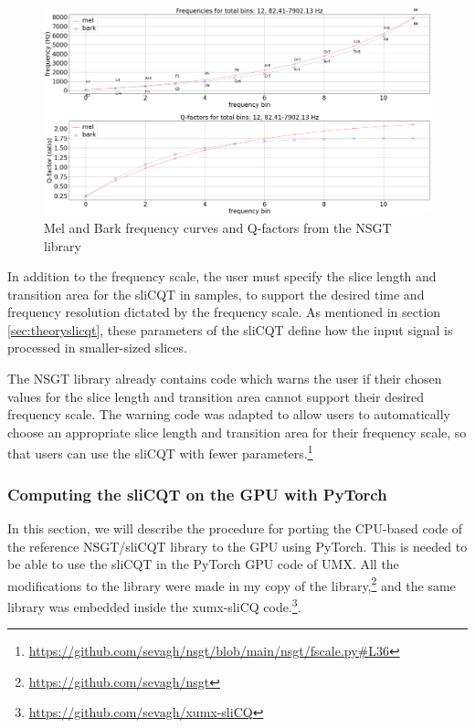 \documentclass[report.tex]{subfiles}
\begin{document}
\begin{figure}[ht]
	\centering
	\includegraphics[width=\textwidth]{./images-freqscales/melbarkpitchesqs.png}
	\caption{Mel and Bark frequency curves and Q-factors from the NSGT library}
	\label{fig:melbarkfsandqs}
\end{figure}

In addition to the frequency scale, the user must specify the slice length and transition area for the sliCQT in samples, to support the desired time and frequency resolution dictated by the frequency scale. As mentioned in section \ref{sec:theoryslicqt}, these parameters of the sliCQT define how the input signal is processed in smaller-sized slices.

The NSGT library already contains code which warns the user if their chosen values for the slice length and transition area cannot support their desired frequency scale. The warning code was adapted to allow users to automatically choose an appropriate slice length and transition area for their frequency scale, so that users can use the sliCQT with fewer parameters.\footnote{\url{https://github.com/sevagh/nsgt/blob/main/nsgt/fscale.py\#L36}}

\subsubsection{Computing the sliCQT on the GPU with PyTorch}
\label{sec:torchgpu}

In this section, we will describe the procedure for porting the CPU-based code of the reference NSGT/sliCQT library to the GPU using PyTorch. This is needed to be able to use the sliCQT in the PyTorch GPU code of UMX. All the modifications to the library were made in my copy of the library,\footnote{\url{https://github.com/sevagh/nsgt}} and the same library was embedded inside the xumx-sliCQ code.\footnote{\url{https://github.com/sevagh/xumx-sliCQ}}.
\end{document}
